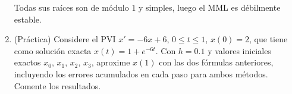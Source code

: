 \begin{ejercicio}
\begin{enumerate}
        Todas sus raíces son de módulo $1$ y simples, luego el MML es débilmente estable.
        \item (Práctica) Considere el PVI $x' = -6x + 6$, $0 \leq t \leq 1$, $x(0) = 2$, que tiene como solución exacta $x(t) = 1 + e^{-6t}$. Con $h = 0.1$ y valores iniciales exactos $x_0$, $x_1$, $x_2$, $x_3$, aproxime $x(1)$ con las dos fórmulas anteriores, incluyendo los errores acumulados en cada paso para ambos métodos. Comente los resultados.
    \end{enumerate}
\end{ejercicio}